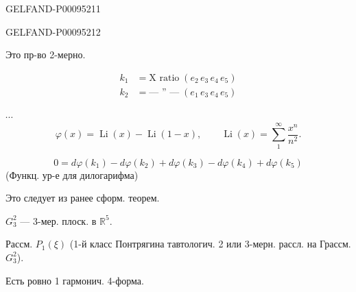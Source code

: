 \begin{GelfandAdjacentEvidence}{GELFAND-P000952}{11}

\end{GelfandAdjacentEvidence}
\begin{GelfandAdjacentEvidence}{GELFAND-P000952}{12}

Это пр-во 2-мерно.

\begin{align*}
 k_1&=\text{X ratio}\;(e_2\,e_3\,e_4\,e_5)\\
 k_2&=\text{--- '' ---}\;(e_1\,e_3\,e_4\,e_5)
\end{align*}
\end{GelfandAdjacentEvidence}

$\cdots$
\[
 \varphi(x)=\operatorname{Li}(x)-\operatorname{Li}(1-x),\qquad
 \operatorname{Li}(x)=\sum_1^\infty\frac{x^n}{n^2}.
\]

\begin{equation*}
 0=d\varphi(k_1)-d\varphi(k_2)+d\varphi(k_3)-d\varphi(k_4)+d\varphi(k_5)
 \tag{14}
\end{equation*}
(Функц. ур-е для дилогарифма)

Это следует из ранее сформ. теорем.

$G_3^2$ --- 3-мер. плоск. в $\mathbb R^5$.

Рассм. $P_1(\xi)$ (1-й класс Понтрягина тавтологич. 2 или 3-мерн. рассл. на Грассм. $G_3^2$).

Есть ровно 1 гармонич. 4-форма.

